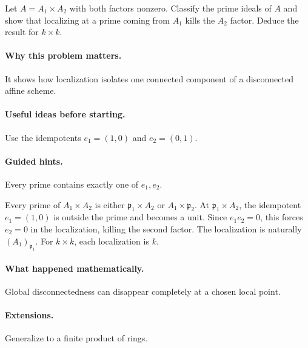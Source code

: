 \begin{problem}
Let $A=A_1\times A_2$ with both factors nonzero.  Classify the prime ideals of $A$ and show that localizing at a prime coming from $A_1$ kills the $A_2$ factor.  Deduce the result for $k\times k$.
\end{problem}

\paragraph{Why this problem matters.}
It shows how localization isolates one connected component of a disconnected affine scheme.

\paragraph{Useful ideas before starting.}
Use the idempotents $e_1=(1,0)$ and $e_2=(0,1)$.

\paragraph{Guided hints.}
Every prime contains exactly one of $e_1,e_2$.

\begin{solution}
Every prime of $A_1\times A_2$ is either $\mathfrak p_1\times A_2$ or $A_1\times\mathfrak p_2$.  At $\mathfrak p_1\times A_2$, the idempotent $e_1=(1,0)$ is outside the prime and becomes a unit.  Since $e_1e_2=0$, this forces $e_2=0$ in the localization, killing the second factor.  The localization is naturally $(A_1)_{\mathfrak p_1}$.  For $k\times k$, each localization is $k$.
\end{solution}

\paragraph{What happened mathematically.}
Global disconnectedness can disappear completely at a chosen local point.

\paragraph{Extensions.}
Generalize to a finite product of rings.
